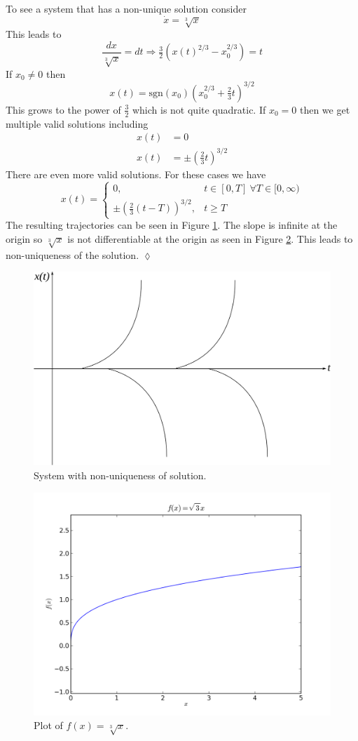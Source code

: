 \begin{example}
To see a system that has a non-unique solution consider
$$\dot{x} = \sqrt[3]{x}$$
This leads to
$$\frac{dx}{\sqrt[3]{x}} = dt \Rightarrow \tfrac{3}{2}\left(x(t)^{2/3}-x_0^{2/3}\right) = t$$
If $x_0\neq0$ then
$$x(t) = \text{sgn}(x_0)\left(x_0^{2/3}+\tfrac{2}{3}t\right)^{3/2}$$
This grows to the power of $\frac{3}{2}$ which is not quite quadratic. If $x_0=0$ then we get multiple valid solutions including
\begin{align*}
x(t) &= 0 \\
x(t) &= \pm(\tfrac{2}{3}t)^{3/2}
\end{align*}
There are even more valid solutions. For these cases we have
$$x(t) = \begin{cases} 0, & t\in[0,T] ~\forall T\in[0,\infty) \\ \pm(\tfrac{2}{3}(t-T))^{3/2}, & t\geq T \end{cases}$$
The resulting trajectories can be seen in Figure \ref{fig:04multsols}. The slope is infinite at the origin so $\sqrt[3]{x}$ is not differentiable at the origin as seen in Figure \ref{fig:04infslope}. This leads to non-uniqueness of the solution.
$\lozenge$
\end{example}

\begin{figure}[ht!]
	\centering
	\includegraphics[width=.5\textwidth]{images/04multsols}
	\caption{System with non-uniqueness of solution.}
	\label{fig:04multsols}
\end{figure}

\begin{figure}[ht!]
	\centering
	\includegraphics[width=.5\textwidth]{images/plotCubeRootX}
	\caption{Plot of $f(x) = \sqrt[3]{x}$.}
	\label{fig:04infslope}
\end{figure}


